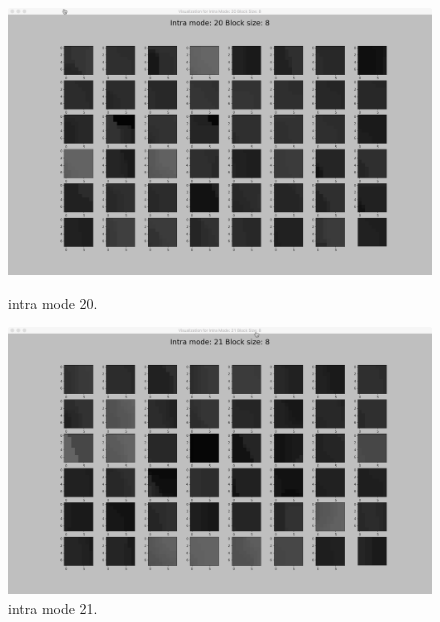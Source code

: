 \begin{figure}[H]
    \begin{minipage}{0.49\textwidth}
        \includegraphics[width=\linewidth]{Figures/visu-size8x8/8-20}
        \caption[Intra mode 20]{intra mode 20.}
        \label{fig:size8_mode20}
    \end{minipage}
    \hspace{\fill} %
    \begin{minipage}{0.49\textwidth}
        \includegraphics[width=\linewidth]{Figures/visu-size8x8/8-21}
        \caption[Intra mode 21]{intra mode 21.}
        \label{fig:size8_mode21}
    \end{minipage}

\end{figure}

